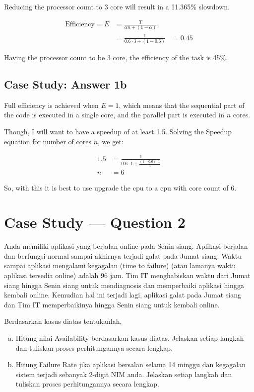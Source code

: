 \documentclass[
	11pt, %
	indonesian
]{assignment}
\begin{document}
Reducing the processor count to 3 core will result in a 11.365\% slowdown.

\[
	\begin{aligned}
		\text{Efficiency} = E & = \frac{T}{\alpha n + (1-\alpha)}  \\
		                      & = \frac{1}{0.6 \cdot 3 + (1- 0.6)}
		                      & = 0.\bar{45}
	\end{aligned}
\]

Having the processor count to be 3 core, the efficiency of the task is 45\%.

\subsection*{Case Study: Answer 1b}

Full efficiency is achieved when \(E = 1\), which means that the sequential part of the code is executed in a single core, and the parallel part is executed in \(n\) cores.

Though, I will want to have a speedup of at least 1.5. Solving the Speedup equation for number of cores \(n\), we get:

\[
	\begin{aligned}
		1.5 & = \frac{1}{0.6 \cdot 1 + \frac{(1-0.6) \cdot 1}{n}} \\
		n   & = 6
	\end{aligned}
\]

So, with this it is best to use upgrade the cpu to a cpu with core count of 6.

\section*{Case Study --- Question 2}

\begin{problem}
Anda memiliki aplikasi yang berjalan online pada Senin siang. Aplikasi berjalan dan berfungsi
normal sampai akhirnya terjadi galat pada Jumat siang. Waktu sampai aplikasi mengalami
kegagalan (time to failure) (atau lamanya waktu aplikasi tersedia online) adalah 96 jam. Tim IT
menghabiskan waktu dari Jumat siang hingga Senin siang untuk mendiagnosis dan memperbaiki
aplikasi hingga kembali online. Kemudian hal ini terjadi lagi, aplikasi galat pada Jumat siang dan
Tim IT memperbaikinya hingga Senin siang untuk kembali online.

\medskip

Berdasarkan kasus diatas tentukanlah,

\medskip

\begin{enumerate}[a.]
	\item Hitung nilai Availability berdasarkan kasus diatas. Jelaskan setiap langkah dan tuliskan proses perhitungannya secara lengkap.
	\item Hitung Failure Rate jika aplikasi bersalan selama 14 minggu dan kegagalan sistem terjadi sebanyak 2-digit NIM anda. Jelaskan setiap langkah dan tuliskan proses perhitungannya secara lengkap.
\end{enumerate}
\end{problem}
\end{document}
